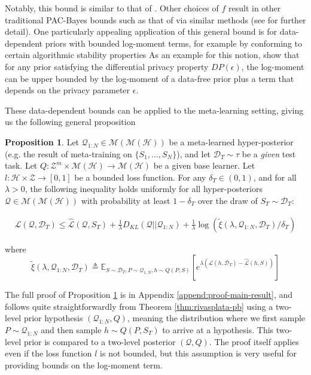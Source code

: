 \documentclass{article}
\theoremstyle{definition}
\newtheorem{proposition}[theorem]{Proposition}
\newcommand{\Expect}[2]{\mathbb{E}_{#1}\left [#2 \right ]}
\begin{document}
Notably, this bound is similar to that of \citet{Catoni2004}. Other choices of $f$ result in other traditional PAC-Bayes bounds such as that of \citet{Mcallester} via similar methods (see \citet{Rivasplata2020} for further detail). 
One particularly appealing application of this general bound is for data-dependent priors with bounded log-moment terms, for example by conforming to certain algorithmic stability properties 
As an example for this notion, \citet{Rivasplata2020} show that for any prior satisfying the differential privacy property $DP(\epsilon)$, the log-moment can be upper bounded by the log-moment of a data-free prior plus a term that depends on the privacy parameter $\epsilon$. 

These data-dependent bounds can be applied to the meta-learning setting, giving us the following general proposition

\begin{proposition} \label{thm:main-result}
	Let $\mathcal{Q}_{1:N}\in \mathcal{M}(\mathcal{M}(\mathcal{H}))$ be a meta-learned hyper-posterior (e.g. the result of meta-training on $\{S_1,...,S_N\}$), and let $\mathcal{D}_T\sim \tau$ be a \emph{given} test task. Let $Q: \mathcal{Z}^m\times\mathcal{M}(\mathcal{H})\rightarrow \mathcal{M}(\mathcal{H})$ be a given base learner. Let $l: \mathcal{H}\times \mathcal{Z}\rightarrow [0, 1]$ be a bounded loss function.
	For any $\delta_T \in (0,1)$, and for all $\lambda>0$, the following inequality holds uniformly for all hyper-posteriors $\mathcal{Q}\in \mathcal{M}(\mathcal{M}(\mathcal{H}))$ with probability at least $1-\delta_T$ over the draw of $S_T\sim \mathcal{D}_T$:
	
	\begin{align} \label{eq:main-result-generic}
	\mathcal{L}(\mathcal{Q}, \mathcal{D}_T) \leq \hat{\mathcal{L}}(\mathcal{Q}, S_T) + \frac{1}{\lambda}D_{KL}(\mathcal{Q}||\mathcal{Q}_{1:N})
	+\frac{1}{\lambda}\log\left ( \tilde{\xi}(\lambda,\mathcal{Q}_{1:N},\mathcal{D}_T)/\delta_T\right )
	\end{align}
	
	
	where 
	$$\tilde{\xi}(\lambda,\mathcal{Q}_{1:N},\mathcal{D}_T)\triangleq \Expect{S\sim \mathcal{D}_T, P\sim \mathcal{Q}_{1:N}, h\sim Q(P,S)}{e^{\lambda\left (\mathcal{L}(h, \mathcal{D}_T)-\hat{\mathcal{L}}(h, S)\right )}}$$
\end{proposition}

The full proof of Proposition \ref{thm:main-result} is in Appendix \ref{append:proof-main-result}, and follows quite straightforwardly from Theorem \ref{thm:rivasplata-pb} using a two-level prior hypothesis $(\mathcal{Q}_{1:N}, Q)$, meaning the distribution where we first sample $P\sim \mathcal{Q}_{1:N}$ and then sample $h\sim Q(P, S_T)$ to arrive at a hypothesis. This two-level prior is compared to a two-level posterior $(\mathcal{Q}, Q)$. The proof itself applies even if the loss function $l$ is not bounded, but this assumption is very useful for providing bounds on the log-moment term.
\end{document}
